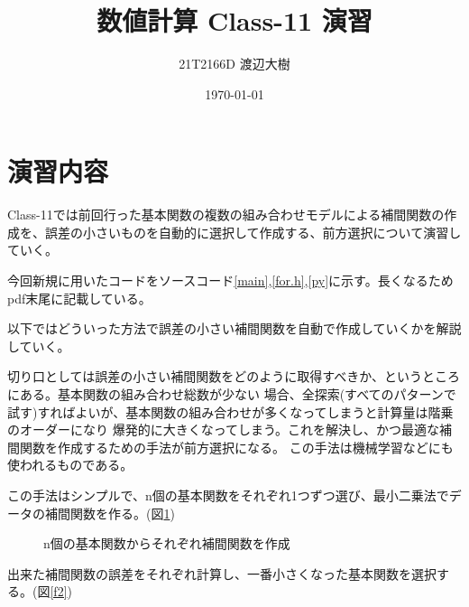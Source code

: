 \documentclass[a4paper,11pt,dvipdfmx]{jsarticle}
\begin{document}

\title{数値計算 Class-11 演習}
\author{21T2166D 渡辺大樹}
\date{\today}
\maketitle

\section{演習内容}
Class-11では前回行った基本関数の複数の組み合わせモデルによる補間関数の作成を、誤差の小さいものを自動的に選択して作成する、前方選択について演習していく。

今回新規に用いたコードをソースコード\ref{main},\ref{for.h},\ref{py}に示す。長くなるためpdf末尾に記載している。

以下ではどういった方法で誤差の小さい補間関数を自動で作成していくかを解説していく。

切り口としては誤差の小さい補間関数をどのように取得すべきか、というところにある。基本関数の組み合わせ総数が少ない
場合、全探索(すべてのパターンで試す)すればよいが、基本関数の組み合わせが多くなってしまうと計算量は階乗のオーダーになり
爆発的に大きくなってしまう。これを解決し、かつ最適な補間関数を作成するための手法が前方選択になる。
この手法は機械学習などにも使われるものである。

この手法はシンプルで、n個の基本関数をそれぞれ1つずつ選び、最小二乗法でデータの補間関数を作る。(図\ref{f1})

\begin{figure}[htbp]
    \centering
    \caption{n個の基本関数からそれぞれ補間関数を作成}
    \label{f1}
\end{figure}

出来た補間関数の誤差をそれぞれ計算し、一番小さくなった基本関数を選択する。(図\ref{f2})
\end{document}
